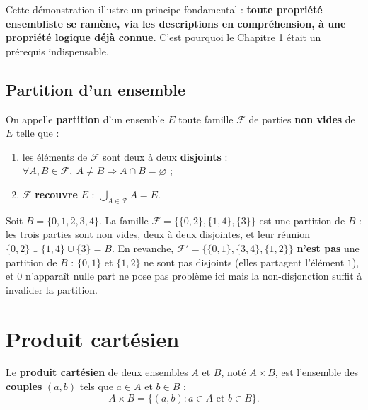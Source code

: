 \documentclass[a4paper,12pt,openany]{book}
\begin{document}
\begin{remarque}
Cette démonstration illustre un principe fondamental : \textbf{toute
propriété ensembliste se ramène, via les descriptions en compréhension, à une
propriété logique déjà connue}. C'est pourquoi le Chapitre 1 était un
prérequis indispensable.
\end{remarque}

\subsection{Partition d'un ensemble}


\begin{definition}
On appelle \textbf{partition} d'un ensemble $E$ toute famille $\mathcal{F}$ de
parties \textbf{non vides} de $E$ telle que :
\begin{enumerate}
  \item les éléments de $\mathcal{F}$ sont deux à deux \textbf{disjoints} :
  $\forall A,B \in \mathcal{F},\ A\neq B \Rightarrow A\cap B = \varnothing$ ;
  \item $\mathcal{F}$ \textbf{recouvre} $E$ : $\displaystyle\bigcup_{A \in
  \mathcal{F}} A = E$.
\end{enumerate}
\end{definition}

\begin{exemple}
Soit $B=\{0,1,2,3,4\}$. La famille $\mathcal{F} = \big\{\{0,2\}, \{1,4\},
\{3\}\big\}$ est une partition de $B$ : les trois parties sont non vides,
deux à deux disjointes, et leur réunion $\{0,2\}\cup\{1,4\}\cup\{3\}=B$.
En revanche, $\mathcal{F}' = \big\{\{0,1\}, \{3,4\}, \{1,2\}\big\}$
\textbf{n'est pas} une partition de $B$ : $\{0,1\}$ et $\{1,2\}$ ne sont pas
disjoints (elles partagent l'élément $1$), et $0$ n'apparaît nulle part ne
pose pas problème ici mais la non-disjonction suffit à invalider la
partition.
\end{exemple}

\section{Produit cartésien}


\begin{definition}
Le \textbf{produit cartésien} de deux ensembles $A$ et $B$, noté $A \times
B$, est l'ensemble des \textbf{couples} $(a,b)$ tels que $a \in A$ et
$b \in B$ :
\[
A \times B = \{(a,b) : a \in A \text{ et } b \in B\}.
\]
\end{definition}
\end{document}
